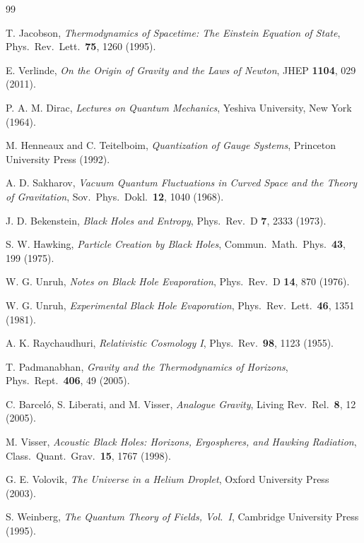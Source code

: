 \documentclass[12pt, a4paper]{article}
\theoremstyle{plain}
\theoremstyle{definition}
\theoremstyle{remark}
\begin{document}
\begin{thebibliography}{99}

T. Jacobson,
\textit{Thermodynamics of Spacetime: The Einstein Equation of State},
Phys.\ Rev.\ Lett.\ \textbf{75}, 1260 (1995).

E. Verlinde,
\textit{On the Origin of Gravity and the Laws of Newton},
JHEP \textbf{1104}, 029 (2011).

P. A. M. Dirac,
\textit{Lectures on Quantum Mechanics},
Yeshiva University, New York (1964).

M. Henneaux and C. Teitelboim,
\textit{Quantization of Gauge Systems},
Princeton University Press (1992).

A. D. Sakharov,
\textit{Vacuum Quantum Fluctuations in Curved Space and the Theory of Gravitation},
Sov.\ Phys.\ Dokl.\ \textbf{12}, 1040 (1968).

J. D. Bekenstein,
\textit{Black Holes and Entropy},
Phys.\ Rev.\ D \textbf{7}, 2333 (1973).

S. W. Hawking,
\textit{Particle Creation by Black Holes},
Commun.\ Math.\ Phys.\ \textbf{43}, 199 (1975).

W. G. Unruh,
\textit{Notes on Black Hole Evaporation},
Phys.\ Rev.\ D \textbf{14}, 870 (1976).

W. G. Unruh,
\textit{Experimental Black Hole Evaporation},
Phys.\ Rev.\ Lett.\ \textbf{46}, 1351 (1981).

A. K. Raychaudhuri,
\textit{Relativistic Cosmology I},
Phys.\ Rev.\ \textbf{98}, 1123 (1955).

T. Padmanabhan,
\textit{Gravity and the Thermodynamics of Horizons},
Phys.\ Rept.\ \textbf{406}, 49 (2005).

C. Barceló, S. Liberati, and M. Visser,
\textit{Analogue Gravity},
Living Rev.\ Rel.\ \textbf{8}, 12 (2005).

M. Visser,
\textit{Acoustic Black Holes: Horizons, Ergospheres, and Hawking Radiation},
Class.\ Quant.\ Grav.\ \textbf{15}, 1767 (1998).

G. E. Volovik,
\textit{The Universe in a Helium Droplet},
Oxford University Press (2003).

S. Weinberg,
\textit{The Quantum Theory of Fields, Vol.\ I},
Cambridge University Press (1995).


\end{thebibliography}
\end{document}
